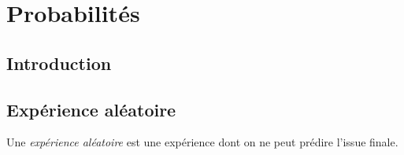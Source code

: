 \documentclass[main.tex]{subfiles}
\begin{document}
\chapter{Probabilités}

\section{Introduction}

\section{Expérience aléatoire}

\begin{definition}

    Une \emph{expérience aléatoire} est une expérience
    dont on ne peut prédire l'issue finale.
\end{definition}
\end{document}
